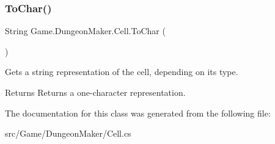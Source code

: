 \subsubsection{\texorpdfstring{To\+Char()}{ToChar()}}
{\footnotesize\ttfamily String Game.\+Dungeon\+Maker.\+Cell.\+To\+Char (\begin{DoxyParamCaption}{ }\end{DoxyParamCaption})}



Gets a string representation of the cell, depending on its type. 

\begin{DoxyReturn}{Returns}
Returns a one-\/character representation.
\end{DoxyReturn}


The documentation for this class was generated from the following file\+:\begin{DoxyCompactItemize}
\item 
src/\+Game/\+Dungeon\+Maker/Cell.\+cs\end{DoxyCompactItemize}
